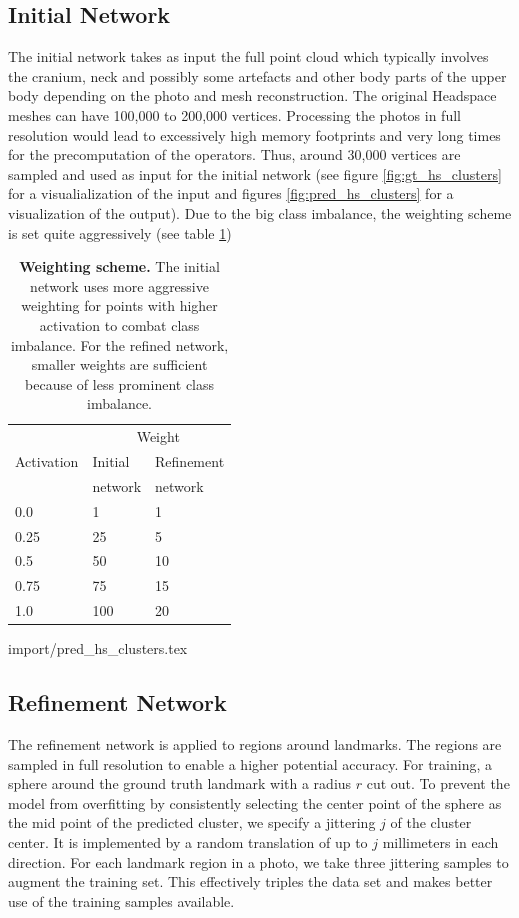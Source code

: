 \documentclass[class=article, crop=false]{standalone}
\begin{document}
\subsection{Initial Network}The initial network takes as input the full point cloud which typically involves the cranium, neck and possibly some artefacts and other body parts of the upper body depending on the photo and mesh reconstruction. The original Headspace meshes can have 100,000 to 200,000 vertices. Processing the photos in full resolution would lead to excessively high memory footprints and very long times for the precomputation of the operators. Thus, around 30,000 vertices are sampled and used as input for the initial network (see figure \ref{fig:gt_hs_clusters} for a visualialization of the input and figures \ref{fig:pred_hs_clusters} for a visualization of the output). Due to the big class imbalance, the weighting scheme is set quite aggressively (see table \ref{tab:weighting-scheme})
\begin{table}[]
\centering
\begin{tabular}[t]{lll}\toprule
 & \multicolumn{2}{c}{Weight} \\
\cmidrule(lr){2-3}
Activation & Initial & Refinement\\
& network & network\\
\hline
0.0        & 1  & 1    \\
0.25       & 25 & 5    \\
0.5        & 50 & 10    \\
0.75       & 75 & 15    \\
1.0        & 100 & 20  \\ \bottomrule
\end{tabular}
\caption{\textbf{Weighting scheme.} The initial network uses more aggressive weighting for points with higher activation to combat class imbalance. For the refined network, smaller weights are sufficient because of less prominent class imbalance.}
\label{tab:weighting-scheme}
\end{table}
{import/pred_hs_clusters.tex}

\subsection{Refinement Network}
The refinement network is applied to regions around landmarks. The regions are sampled in full resolution to enable a higher potential accuracy. For training, a sphere around the ground truth landmark with a radius $r$ cut out. To prevent the model from overfitting by consistently selecting the center point of the sphere as the mid point of the predicted cluster, we specify a jittering $j$ of the cluster center. It is implemented by a random translation of up to $j$ millimeters in each direction. For each landmark region in a photo, we take three jittering samples to augment the training set. This effectively triples the data set and makes better use of the training samples available.
\end{document}
